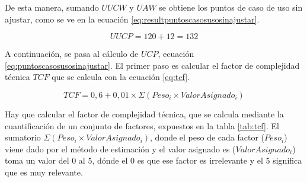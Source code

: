 \par De esta manera, sumando $UUCW$ y $UAW$ se obtiene los puntos de caso de uso sin ajustar, como se ve en la ecuación \ref{eq:resultpuntoscasosusosinajustar}.

\begin{equation} \label{eq:resultpuntoscasosusosinajustar}
  UUCP = 120 + 12 = 132
\end{equation}

\par A continuación, se pasa al cálculo de $UCP$, ecuación \ref{eq:puntoscasosusosinajustar}. El primer paso es calcular el factor de complejidad técnica $TCF$ que se calcula con la ecuación \ref{eq:tcf}.

\begin{equation} \label{eq:tcf}
  TCF = 0,6 + 0,01 \times \Sigma (Peso_i \times ValorAsignado_i)
\end{equation}

\par Hay que calcular el factor de complejidad técnica, que se calcula mediante la cuantificación de un conjunto de factores, expuestos en la tabla \ref{tab:tcf}. El sumatorio $\Sigma (Peso_i \times ValorAsignado_i)$, donde el peso de cada factor ($Peso_i$) viene dado por el método de estimación y el valor asignado es ($ValorAsignado_i$) toma un valor del 0 al 5, dónde el 0 es que ese factor es irrelevante y el 5 significa que es muy relevante.

